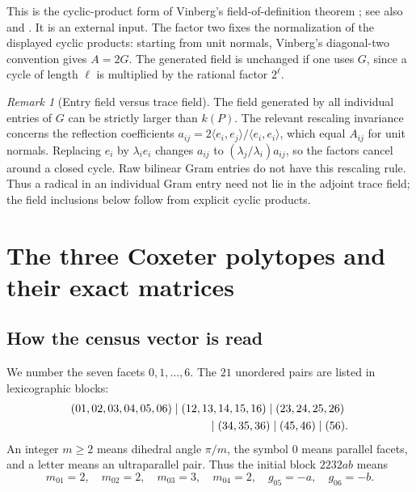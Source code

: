 \documentclass[11pt]{article}
\numberwithin{equation}{section}
\theoremstyle{definition}
\theoremstyle{remark}
\newtheorem{remark}[theorem]{Remark}
\begin{document}
This is the cyclic-product form of Vinberg's field-of-definition theorem
\cite{VinbergRings}; see also \cite[Section~4.1]{EmeryMila} and
\cite[Section~3.1]{GuoMaZangZheng}.  It is an external input.  The factor two
fixes the normalization of the displayed cyclic products: starting from unit
normals, Vinberg's diagonal-two convention gives \(A=2G\).  The generated
field is unchanged if one uses \(G\), since a cycle of length \(\ell\) is
multiplied by the rational factor \(2^\ell\).

\begin{remark}[Entry field versus trace field]
The field generated by all individual entries of \(G\) can be strictly
larger than \(k(P)\).  The relevant rescaling invariance concerns the
reflection coefficients
\(a_{ij}=2\langle e_i,e_j\rangle/\langle e_i,e_i\rangle\), which equal
\(A_{ij}\) for unit normals.  Replacing \(e_i\) by \(\lambda_i e_i\)
changes \(a_{ij}\) to \((\lambda_j/\lambda_i)a_{ij}\), so the factors
cancel around a closed cycle.  Raw bilinear Gram entries do not have this
rescaling rule.  Thus a radical in an individual Gram entry need not lie in
the adjoint trace field; the field inclusions below follow from explicit
cyclic products.
\end{remark}

\section{The three Coxeter polytopes and their exact matrices}
\label{sec:coxeter-data}

\subsection{How the census vector is read}

We number the seven facets \(0,1,\ldots,6\).  The \(21\) unordered pairs are
listed in lexicographic blocks:
\begin{equation}
\begin{split}
 &(01,02,03,04,05,06)\mid(12,13,14,15,16)\mid(23,24,25,26)\\
 &\hspace{43mm}\mid(34,35,36)\mid(45,46)\mid(56).
\end{split}
\label{eq:pair-order}
\end{equation}
An integer \(m\ge2\) means dihedral angle \(\pi/m\), the symbol \(0\)
means parallel facets, and a letter means an ultraparallel pair.  Thus the
initial block \(2232ab\) means
\[
 m_{01}=2,\quad m_{02}=2,\quad m_{03}=3,\quad m_{04}=2,
 \quad g_{05}=-a,\quad g_{06}=-b.
\]
\end{document}
